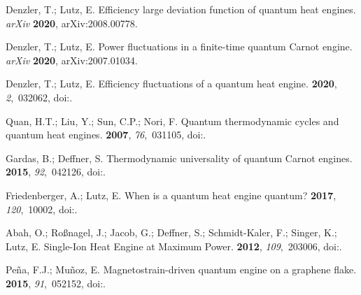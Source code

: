 \documentclass[preprints,article,accept,moreauthors,pdftex]{Definitions/mdpi}
\begin{document}
\begin{thebibliography}{999}
Denzler, T.; Lutz, E.
\newblock Efficiency large deviation function of quantum heat engines. \emph{arXiv}  \textbf{2020}, arXiv:2008.00778.


Denzler, T.; Lutz, E.
\newblock Power fluctuations in a finite-time quantum {C}arnot engine. \emph{arXiv}  \textbf{2020}, arXiv:2007.01034.


Denzler, T.; Lutz, E.
\newblock Efficiency fluctuations of a quantum heat engine.
 {\bf 2020}, {\em 2},~032062,
\linebreak
  doi:{\href{https://doi.org/10.1103/PhysRevResearch.2.032062}{}}.

Quan, H.T.; Liu, Y.; Sun, C.P.; Nori, F.
\newblock Quantum thermodynamic cycles and quantum heat engines.
 {\bf 2007}, {\em 76},~031105,
\newblock
  doi:{\href{https://doi.org/10.1103/PhysRevE.76.031105}{}}.

Gardas, B.; Deffner, S.
\newblock Thermodynamic universality of quantum {C}arnot engines.
 {\bf 2015}, {\em 92},~042126,
\newblock
  doi:{\href{https://doi.org/10.1103/PhysRevE.92.042126}{}}.

Friedenberger, A.; Lutz, E.
\newblock When is a quantum heat engine quantum?
 {\bf 2017}, {\em 120},~10002,
\newblock
  doi:{\href{https://doi.org/10.1209/0295-5075/120/10002}{}}.

Abah, O.; Ro\ss{}nagel, J.; Jacob, G.; Deffner, S.; Schmidt-Kaler, F.; Singer,
  K.; Lutz, E.
\newblock Single-Ion Heat Engine at Maximum Power.
 {\bf 2012}, {\em 109},~203006,
\newblock
  doi:{\href{https://doi.org/10.1103/PhysRevLett.109.203006}{}}.

Pe\~na, F.J.; Mu\~noz, E.
\newblock Magnetostrain-driven quantum engine on a graphene flake.
 {\bf 2015}, {\em 91},~052152,
\newblock
  doi:{\href{https://doi.org/10.1103/PhysRevE.91.052152}{}}.


\end{thebibliography}
\end{document}

